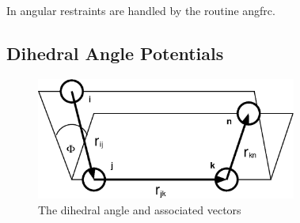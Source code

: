 In \D{} angular restraints are handled by the routine {\sc angfrc}.

\subsection{Dihedral Angle Potentials}

\begin{figure}[ht]
\begin{center}
\includegraphics[height=4cm]{dihed.eps}
\caption{The dihedral angle and associated vectors}
\end{center}
\end{figure}

